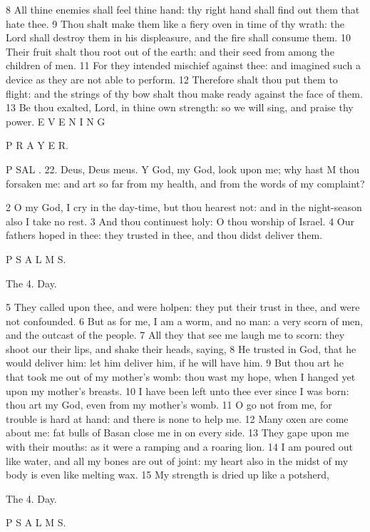 8 All thine enemies shall feel thine hand: thy right hand shall find out them that hate thee. 9 Thou shalt make them like a fiery oven in time of thy wrath: the Lord shall destroy them in his displeasure, and the fire shall consume them. 10 Their fruit shalt thou root out of the earth: and their seed from among the children of men. 11 For they intended mischief against thee: and imagined such a device as they are not able to perform. 12 Therefore shalt thou put them to flight: and the strings of thy bow shalt thou make ready against the face of them. 13 Be thou exalted, Lord, in thine own strength: so we will sing, and praise thy power. E V E N I N G

P R A Y E R.

P SAL . 22. Deus, Deus meus. Y God, my God, look upon me; why hast M thou forsaken me: and art so far from my health, and from the words of my complaint?

2 O my God, I cry in the day-time, but thou hearest not: and in the night-season also I take no rest. 3 And thou continuest holy: O thou worship of Israel. 4 Our fathers hoped in thee: they trusted in thee, and thou didst deliver them.

P S A L M S.

The 4. Day.

5 They called upon thee, and were holpen: they put their trust in thee, and were not confounded. 6 But as for me, I am a worm, and no man: a very scorn of men, and the outcast of the people. 7 All they that see me laugh me to scorn: they shoot our their lips, and shake their heads, saying, 8 He trusted in God, that he would deliver him: let him deliver him, if he will have him. 9 But thou art he that took me out of my mother’s womb: thou wast my hope, when I hanged yet upon my mother’s breasts. 10 I have been left unto thee ever since I was born: thou art my God, even from my mother’s womb. 11 O go not from me, for trouble is hard at hand: and there is none to help me. 12 Many oxen are come about me: fat bulls of Basan close me in on every side. 13 They gape upon me with their mouths: as it were a ramping and a roaring lion. 14 I am poured out like water, and all my bones are out of joint: my heart also in the midst of my body is even like melting wax. 15 My strength is dried up like a potsherd,

The 4. Day.

P S A L M S.

